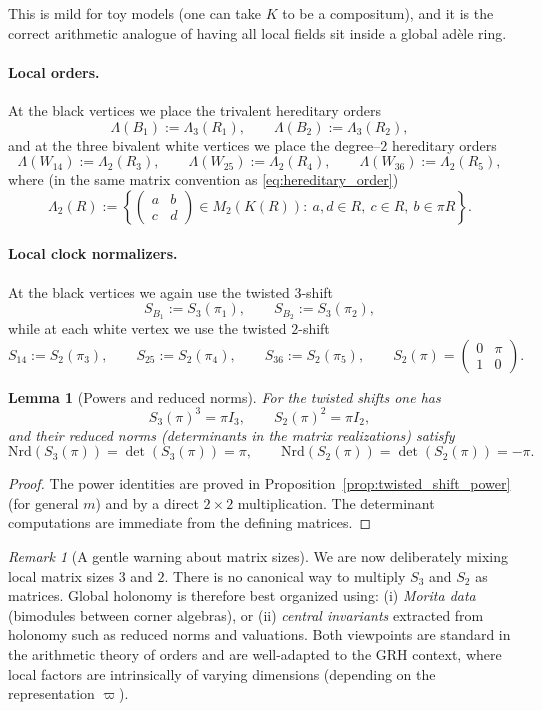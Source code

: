 \documentclass[11pt,oneside]{amsbook}
\numberwithin{equation}{section}
\theoremstyle{plain}
\newtheorem{lemma}[theorem]{Lemma}
\theoremstyle{definition}
\theoremstyle{remark}
\newtheorem{remark}[theorem]{Remark}
\begin{document}
This is mild for toy models (one can take $K$ to be a compositum), and it is the correct arithmetic analogue of having all local fields sit inside a global adèle ring.

\paragraph{Local orders.}
At the black vertices we place the trivalent hereditary orders
\[
\Lambda(B_1):=\Lambda_3(R_1),\qquad \Lambda(B_2):=\Lambda_3(R_2),
\]
and at the three bivalent white vertices we place the degree--$2$ hereditary orders
\[
\Lambda(W_{14}):=\Lambda_2(R_3),\qquad \Lambda(W_{25}):=\Lambda_2(R_4),\qquad \Lambda(W_{36}):=\Lambda_2(R_5),
\]
where (in the same matrix convention as \eqref{eq:hereditary_order})
\[
\Lambda_2(R):=
\left\{
\begin{pmatrix}
a & b\\
c & d
\end{pmatrix}\in M_2(K(R)):\ a,d\in R,\ c\in R,\ b\in \pi R
\right\}.
\]

\paragraph{Local clock normalizers.}
At the black vertices we again use the twisted $3$-shift
\[
S_{B_1}:=S_3(\pi_1),\qquad S_{B_2}:=S_3(\pi_2),
\]
while at each white vertex we use the twisted $2$-shift
\[
S_{14}:=S_2(\pi_3),\qquad S_{25}:=S_2(\pi_4),\qquad S_{36}:=S_2(\pi_5),
\qquad 
S_2(\pi)=
\begin{pmatrix}
0&\pi\\
1&0
\end{pmatrix}.
\]

\begin{lemma}[Powers and reduced norms]
\label{lem:powers_reduced_norms}
For the twisted shifts one has
\[
S_3(\pi)^3=\pi I_3,\qquad S_2(\pi)^2=\pi I_2,
\]
and their reduced norms (determinants in the matrix realizations) satisfy
\[
\mathrm{Nrd}(S_3(\pi))=\det(S_3(\pi))=\pi,\qquad 
\mathrm{Nrd}(S_2(\pi))=\det(S_2(\pi))=-\pi.
\]
\end{lemma}

\begin{proof}
The power identities are proved in Proposition~\ref{prop:twisted_shift_power} (for general $m$) and by a direct $2\times 2$ multiplication.
The determinant computations are immediate from the defining matrices.
\end{proof}

\begin{remark}[A gentle warning about matrix sizes]
We are now deliberately mixing local matrix sizes $3$ and $2$.
There is no canonical way to multiply $S_3$ and $S_2$ as matrices.
Global holonomy is therefore best organized using:
(i) \emph{Morita data} (bimodules between corner algebras), or
(ii) \emph{central invariants} extracted from holonomy such as reduced norms and valuations.
Both viewpoints are standard in the arithmetic theory of orders and are well-adapted to the GRH context, where local factors are intrinsically of varying dimensions (depending on the representation $\varpi$).
\end{remark}
\end{document}
